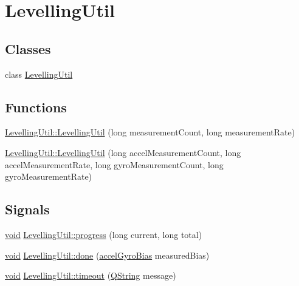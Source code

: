 \hypertarget{group___levelling_util}{\section{\-Levelling\-Util}
\label{group___levelling_util}
}
\subsection*{\-Classes}
\begin{DoxyCompactItemize}
\item 
class \hyperlink{class_levelling_util}{\-Levelling\-Util}
\end{DoxyCompactItemize}
\subsection*{\-Functions}
\begin{DoxyCompactItemize}
\item 
\hyperlink{group___levelling_util_ga01074f8582e6874acc1a566e55f30b53}{\-Levelling\-Util\-::\-Levelling\-Util} (long measurement\-Count, long measurement\-Rate)
\item 
\hyperlink{group___levelling_util_ga7112024f171b944816a5c7cdeab07642}{\-Levelling\-Util\-::\-Levelling\-Util} (long accel\-Measurement\-Count, long accel\-Measurement\-Rate, long gyro\-Measurement\-Count, long gyro\-Measurement\-Rate)
\end{DoxyCompactItemize}
\subsection*{\-Signals}
\begin{DoxyCompactItemize}
\item 
\hyperlink{group___u_a_v_objects_plugin_ga444cf2ff3f0ecbe028adce838d373f5c}{void} \hyperlink{group___levelling_util_gab523cee804f97da56e83162210546c36}{\-Levelling\-Util\-::progress} (long current, long total)
\item 
\hyperlink{group___u_a_v_objects_plugin_ga444cf2ff3f0ecbe028adce838d373f5c}{void} \hyperlink{group___levelling_util_ga7fde9c70306e392dd49fef6c2f17f983}{\-Levelling\-Util\-::done} (\hyperlink{structaccel_gyro_bias}{accel\-Gyro\-Bias} measured\-Bias)
\item 
\hyperlink{group___u_a_v_objects_plugin_ga444cf2ff3f0ecbe028adce838d373f5c}{void} \hyperlink{group___levelling_util_gac10890045336d643555fb7bc687e6d0a}{\-Levelling\-Util\-::timeout} (\hyperlink{group___u_a_v_objects_plugin_gab9d252f49c333c94a72f97ce3105a32d}{\-Q\-String} message)
\end{DoxyCompactItemize}
